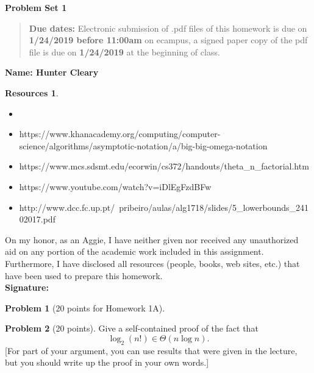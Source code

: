 \documentclass{article}
\theoremstyle{definition}
\newtheorem{problem}{Problem}
\newtheorem*{solution}{Solution}
\newtheorem*{resources}{Resources}
\newcommand{\name}[1]{\noindent\textbf{Name: #1}}
\newcommand{\honor}{\noindent On my honor, as an Aggie, I have neither
  given nor received any unauthorized aid on any portion of the
  academic work included in this assignment. Furthermore, I have
  disclosed all resources (people, books, web sites, etc.) that have
  been used to prepare this homework. \\[1ex]
 \textbf{Signature:} \underline{\hspace*{5cm}} }
\newcommand{\problemset}[1]{\begin{center}\textbf{Problem Set #1}\end{center}}
\newcommand{\duedate}[2]{\begin{quote}\textbf{Due dates:} Electronic submission of .pdf files of this homework is due on \textbf{#1} on ecampus, a signed paper copy
    of the pdf file is due on \textbf{#2} at the beginning of
    class. \end{quote} }
\begin{document}
\problemset{1}
\duedate{1/24/2019 before 11:00am}{1/24/2019}
\name{ Hunter Cleary}
\begin{resources}\\ 
\begin{itemize}
    \item
    \item https://www.khanacademy.org/computing/computer-science/algorithms/asymptotic-notation/a/big-big-omega-notation
    \item https://www.mcs.sdsmt.edu/ecorwin/cs372/handouts/theta\_n\_factorial.htm
    \item https://www.youtube.com/watch?v=iDlEgFzdBFw
    \item http://www.dcc.fc.up.pt/~pribeiro/aulas/alg1718/slides/5\_lowerbounds\_24102017.pdf
\end{itemize}

\end{resources}
\honor

\newpage

\begin{problem}[20 points for Homework 1A]
\end{problem}



\begin{problem}[20 points] 
Give a self-contained proof of the fact that 
$$\log_2(n!)\in \Theta(n\log n).$$
[For part of your argument, you can use results that were given in the
lecture, but you should write up the proof in your own words.] \\ 
\end{problem} 
\end{document}
